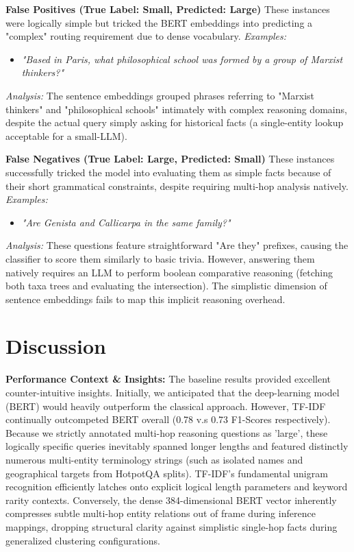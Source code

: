 \documentclass[12pt, a4paper]{article}
\begin{document}
\textbf{False Positives (True Label: Small, Predicted: Large)}
These instances were logically simple but tricked the BERT embeddings into predicting a "complex" routing requirement due to dense vocabulary.
\textit{Examples:}
\begin{itemize}
    \item \textit{"Based in Paris, what philosophical school was formed by a group of Marxist thinkers?"}
\end{itemize}
\textit{Analysis:} The sentence embeddings grouped phrases referring to "Marxist thinkers" and "philosophical schools" intimately with complex reasoning domains, despite the actual query simply asking for historical facts (a single-entity lookup acceptable for a small-LLM).

\textbf{False Negatives (True Label: Large, Predicted: Small)}
These instances successfully tricked the model into evaluating them as simple facts because of their short grammatical constraints, despite requiring multi-hop analysis natively.
\textit{Examples:}
\begin{itemize}
    \item \textit{"Are Genista and Callicarpa in the same family?"}
\end{itemize}
\textit{Analysis:} These questions feature straightforward "Are they" prefixes, causing the classifier to score them similarly to basic trivia. However, answering them natively requires an LLM to perform boolean comparative reasoning (fetching both taxa trees and evaluating the intersection). The simplistic dimension of sentence embeddings fails to map this implicit reasoning overhead.

\pagebreak

\section{Discussion}
\textbf{Performance Context \& Insights:}
The baseline results provided excellent counter-intuitive insights. Initially, we anticipated that the deep-learning model (BERT) would heavily outperform the classical approach. However, TF-IDF continually outcompeted BERT overall (0.78 v.s 0.73 F1-Scores respectively). Because we strictly annotated multi-hop reasoning questions as 'large', these logically specific queries inevitably spanned longer lengths and featured distinctly numerous multi-entity terminology strings (such as isolated names and geographical targets from HotpotQA splits). TF-IDF's fundamental unigram recognition efficiently latches onto explicit logical length parameters and keyword rarity contexts. Conversely, the dense 384-dimensional BERT vector inherently compresses subtle multi-hop entity relations out of frame during inference mappings, dropping structural clarity against simplistic single-hop facts during generalized clustering configurations. 
\end{document}
